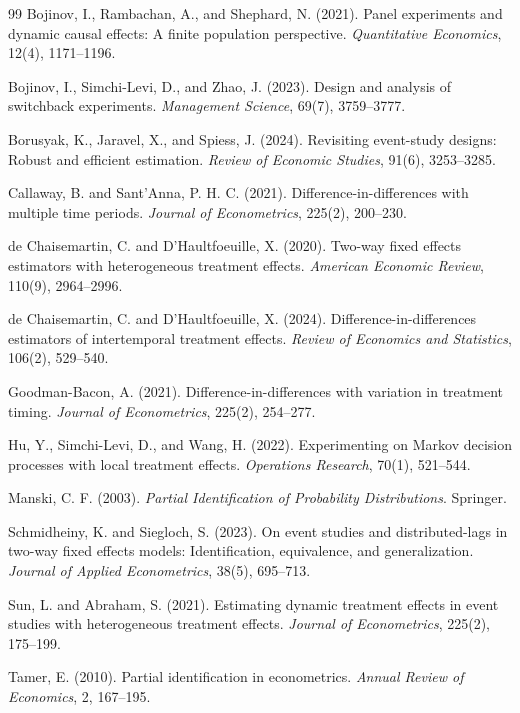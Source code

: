 \documentclass[11pt]{article}
\theoremstyle{definition}
\theoremstyle{plain}
\theoremstyle{remark}
\begin{document}
\begin{thebibliography}{99}
Bojinov, I., Rambachan, A., and Shephard, N. (2021).
Panel experiments and dynamic causal effects: A finite population perspective.
\emph{Quantitative Economics}, 12(4), 1171--1196.

Bojinov, I., Simchi-Levi, D., and Zhao, J. (2023).
Design and analysis of switchback experiments.
\emph{Management Science}, 69(7), 3759--3777.

Borusyak, K., Jaravel, X., and Spiess, J. (2024).
Revisiting event-study designs: Robust and efficient estimation.
\emph{Review of Economic Studies}, 91(6), 3253--3285.

Callaway, B. and Sant'Anna, P. H. C. (2021).
Difference-in-differences with multiple time periods.
\emph{Journal of Econometrics}, 225(2), 200--230.

de Chaisemartin, C. and D'Haultfoeuille, X. (2020).
Two-way fixed effects estimators with heterogeneous treatment effects.
\emph{American Economic Review}, 110(9), 2964--2996.

de Chaisemartin, C. and D'Haultfoeuille, X. (2024).
Difference-in-differences estimators of intertemporal treatment effects.
\emph{Review of Economics and Statistics}, 106(2), 529--540.

Goodman-Bacon, A. (2021).
Difference-in-differences with variation in treatment timing.
\emph{Journal of Econometrics}, 225(2), 254--277.

Hu, Y., Simchi-Levi, D., and Wang, H. (2022).
Experimenting on Markov decision processes with local treatment effects.
\emph{Operations Research}, 70(1), 521--544.

Manski, C. F. (2003).
\emph{Partial Identification of Probability Distributions}.
Springer.

Schmidheiny, K. and Siegloch, S. (2023).
On event studies and distributed-lags in two-way fixed effects models: Identification, equivalence, and generalization.
\emph{Journal of Applied Econometrics}, 38(5), 695--713.

Sun, L. and Abraham, S. (2021).
Estimating dynamic treatment effects in event studies with heterogeneous treatment effects.
\emph{Journal of Econometrics}, 225(2), 175--199.

Tamer, E. (2010).
Partial identification in econometrics.
\emph{Annual Review of Economics}, 2, 167--195.
\end{thebibliography}
\end{document}
